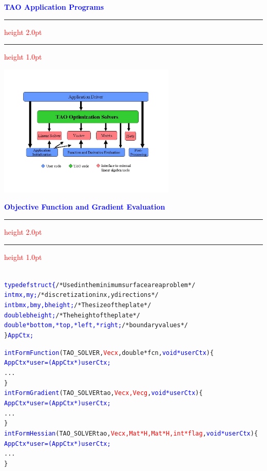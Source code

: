 \documentclass{seminar}
\newcommand{\redstripe}{\textcolor{red}{\hrule height 2.0pt\hfil}
             \vspace{-1.8pt}
             \textcolor{red}{\hrule height 1.0pt\hfil}
}
\newcommand{\heading}[1]{%
   \centerline{\textcolor{blue}{\textbf{#1}}}%
    \redstripe%
    \bigskip
}
\begin{document}
\begin{slide}
\heading{TAO Application Programs}
\centerline {\includegraphics[height=2.5in]{../images/tao_pic3}}
\vfill
\end{slide}




\begin{slide}

\heading{Objective Function and Gradient Evaluation}

\begin{alltt}
\scriptsize \setlength{\baselineskip}{8pt}
\textcolor{blue}{
  typedef struct \{}          /* Used in the minimum surface area problem */
    \textcolor{blue}{int         mx, my;}            /* discretization in x, y directions */
    \textcolor{blue}{int         bmx, bmy, bheight;}             /* The size of the plate */
    \textcolor{blue}{double      bheight;}                     /* The height of the plate */
    \textcolor{blue}{double     *bottom, *top, *left, *right;}         /* boundary values */
  \} \textcolor{blue}{AppCtx;}

  \textcolor{blue}{int FormFunction}(TAO_SOLVER, \textcolor{red}{Vec x}, double *fcn, \textcolor{blue}{void *userCtx})\{
     \textcolor{blue}{AppCtx *user = (AppCtx *)userCtx;}
     ...
  \}
  \textcolor{blue}{int FormGradient}(TAO_SOLVER tao, \textcolor{red}{Vec x, Vec g}, \textcolor{blue}{void *userCtx})\{
     \textcolor{blue}{AppCtx *user = (AppCtx *)userCtx;}
     ...
  \}
  \textcolor{blue}{int FormHessian}(TAO_SOLVER tao,  \textcolor{red}{Vec x, Mat *H, Mat *H, int *flag}, \textcolor{blue}{void *userCtx})\{
     \textcolor{blue}{AppCtx *user = (AppCtx *)userCtx;}
     ...
  \}

\end{alltt}

\vfill

\end{slide}
\end{document}
